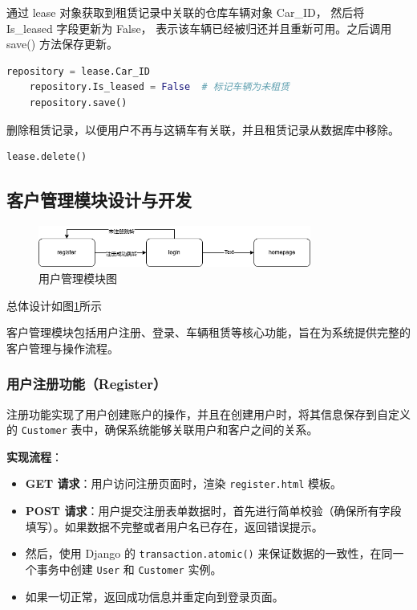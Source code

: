 \documentclass[UTF8,a4paper,12pt]{ctexart}
\begin{document}
通过 lease 对象获取到租赁记录中关联的仓库车辆对象 Car\_ID，
然后将 Is\_leased 字段更新为 False，
表示该车辆已经被归还并且重新可用。之后调用 save() 方法保存更新。

\begin{lstlisting}[language=Python]
    repository = lease.Car_ID
    repository.Is_leased = False  # 标记车辆为未租赁
    repository.save()
\end{lstlisting}

删除租赁记录，以便用户不再与这辆车有关联，并且租赁记录从数据库中移除。

\begin{lstlisting}[language=Python]
    lease.delete()
\end{lstlisting}

\subsection{客户管理模块设计与开发}

\begin{figure}[htbp]  %
    \centering  %
    \includegraphics[width=0.8\textwidth]{pic/user_management.png}
    \caption{用户管理模块图}  %
    \label{fig:um}  %
\end{figure}


总体设计如图\ref{fig:um}所示

客户管理模块包括用户注册、登录、车辆租赁等核心功能，旨在为系统提供完整的客户管理与操作流程。

\subsubsection{用户注册功能（Register）}
注册功能实现了用户创建账户的操作，并且在创建用户时，将其信息保存到自定义的 \texttt{Customer} 表中，确保系统能够关联用户和客户之间的关系。

\textbf{实现流程}：
\begin{itemize}
    \item \textbf{GET 请求}：用户访问注册页面时，渲染 \texttt{register.html} 模板。
    \item \textbf{POST 请求}：用户提交注册表单数据时，首先进行简单校验（确保所有字段填写）。如果数据不完整或者用户名已存在，返回错误提示。
    \item 然后，使用 Django 的 \texttt{transaction.atomic()} 来保证数据的一致性，在同一个事务中创建 \texttt{User} 和 \texttt{Customer} 实例。
    \item 如果一切正常，返回成功信息并重定向到登录页面。
\end{itemize}
\end{document}
